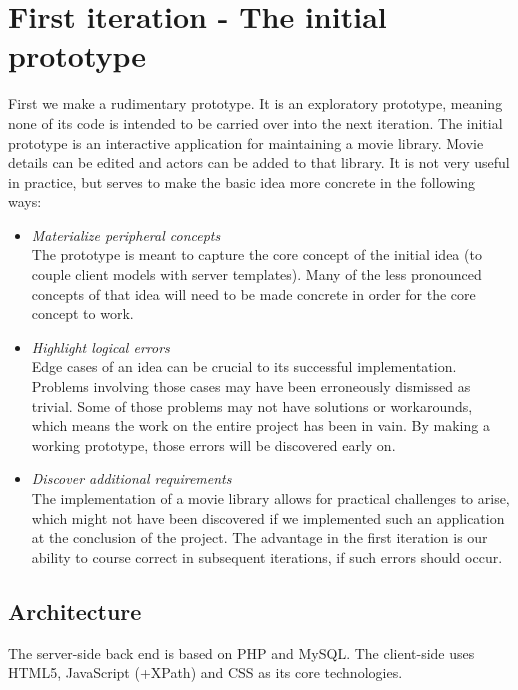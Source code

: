 \chapter{First iteration - The initial prototype}
First we make a rudimentary prototype. It is an exploratory prototype,
meaning none of its code is intended to be carried over into the next iteration.
The initial prototype is an interactive application for maintaining a movie
library. Movie details can be edited and actors can be added to that library.
It is not very useful in practice, but serves to make the basic idea more
concrete in the following ways:

\begin{itemize}
	\label{list:prototype-motivation}
	\item \emph{Materialize peripheral concepts}\\
	The prototype is meant to capture the core concept of the initial idea
	(to couple client models with server templates).
	Many of the less pronounced concepts of that idea will need to be made
	concrete in order for the core concept to work.
	\item \emph{Highlight logical errors}\\
	Edge cases of an idea can be crucial to its successful implementation.
	Problems involving those cases may have been erroneously dismissed as trivial.
	Some of those problems may not have solutions or workarounds, which
	means the work on the entire project has been in vain. By making a working
	prototype, those errors will be discovered early on.
	\item \emph{Discover additional requirements}\\
	The implementation of a movie library allows for practical challenges to
	arise, which might not have been discovered if we implemented such an
	application at the conclusion of the project. The advantage in the
	first iteration is our ability to course correct in subsequent iterations,
	if such errors should occur.
\end{itemize}

\section{Architecture}

The server-side back end is based on PHP and MySQL. The client-side uses
HTML5, JavaScript (+XPath) and CSS as its core technologies.

